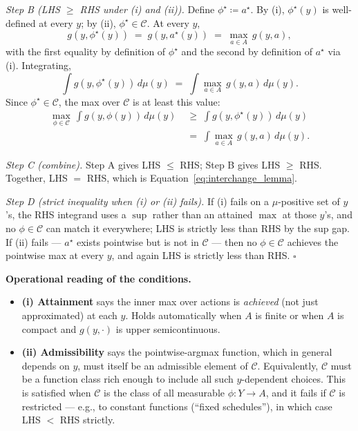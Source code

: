 \documentclass[11pt]{article}
\begin{document}
\begin{framed}
\emph{Step B (LHS $\geq$ RHS under (i) and (ii)).}  Define $\phi^\star \coloneqq a^\star$.  By (i), $\phi^\star(y)$ is well-defined at every $y$; by (ii), $\phi^\star \in \mathcal{C}$.  At every $y$,
\begin{equation*}
g(y, \phi^\star(y)) \;=\; g(y, a^\star(y)) \;=\; \max_{a \in A}\, g(y, a),
\end{equation*}
with the first equality by definition of $\phi^\star$ and the second by definition of $a^\star$ via (i).  Integrating,
\begin{equation*}
\int g(y, \phi^\star(y))\, d\mu(y) \;=\; \int \max_{a \in A}\, g(y, a)\, d\mu(y).
\end{equation*}
Since $\phi^\star \in \mathcal{C}$, the max over $\mathcal{C}$ is at least this value:
\begin{align*}
\max_{\phi \in \mathcal{C}}\, \int g(y, \phi(y))\, d\mu(y)
&\;\geq\; \int g(y, \phi^\star(y))\, d\mu(y) \\
&\;=\; \int \max_{a \in A}\, g(y, a)\, d\mu(y).
\end{align*}

\emph{Step C (combine).}  Step A gives LHS $\leq$ RHS; Step B gives LHS $\geq$ RHS.  Together, LHS $=$ RHS, which is Equation~\eqref{eq:interchange_lemma}.

\emph{Step D (strict inequality when (i) or (ii) fails).}  If (i) fails on a $\mu$-positive set of $y$'s, the RHS integrand uses a $\sup$ rather than an attained $\max$ at those $y$'s, and no $\phi \in \mathcal{C}$ can match it everywhere; LHS is strictly less than RHS by the sup gap.  If (ii) fails --- $a^\star$ exists pointwise but is not in $\mathcal{C}$ --- then no $\phi \in \mathcal{C}$ achieves the pointwise max at every $y$, and again LHS is strictly less than RHS.  $\square$

\vspace{4pt}
\textbf{Operational reading of the conditions.}
\begin{itemize}[nosep, leftmargin=*]
\item \textbf{(i) Attainment} says the inner max over actions is \emph{achieved} (not just approximated) at each $y$.  Holds automatically when $A$ is finite or when $A$ is compact and $g(y, \cdot)$ is upper semicontinuous.
\item \textbf{(ii) Admissibility} says the pointwise-argmax function, which in general depends on $y$, must itself be an admissible element of $\mathcal{C}$.  Equivalently, $\mathcal{C}$ must be a function class rich enough to include all such $y$-dependent choices.  This is satisfied when $\mathcal{C}$ is the class of all measurable $\phi: Y \to A$, and it fails if $\mathcal{C}$ is restricted --- e.g., to constant functions (``fixed schedules''), in which case LHS $<$ RHS strictly.
\end{itemize}
\end{framed}
\end{document}
